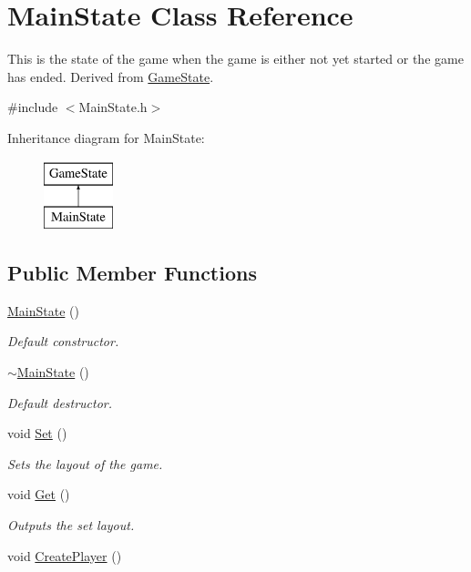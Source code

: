 \hypertarget{classMainState}{\section{Main\-State Class Reference}
\label{classMainState}
}


This is the state of the game when the game is either not yet started or the game has ended. Derived from \hyperlink{classGameState}{Game\-State}.  




{\ttfamily \#include $<$Main\-State.\-h$>$}

Inheritance diagram for Main\-State\-:\begin{figure}[H]
\begin{center}
\leavevmode
\includegraphics[height=2.000000cm]{classMainState}
\end{center}
\end{figure}
\subsection*{Public Member Functions}
\begin{DoxyCompactItemize}
\item 
\hyperlink{classMainState_afc29557ba046813d1bff4aea2501b7f1}{Main\-State} ()
\begin{DoxyCompactList}\small\item\em Default constructor. \end{DoxyCompactList}\item 
\hyperlink{classMainState_a81d631457b9c7777d09aff85a368acd9}{$\sim$\-Main\-State} ()
\begin{DoxyCompactList}\small\item\em Default destructor. \end{DoxyCompactList}\item 
void \hyperlink{classMainState_ac01eced9d617c8c8f5382a9aa96adb45}{Set} ()
\begin{DoxyCompactList}\small\item\em Sets the layout of the game. \end{DoxyCompactList}\item 
void \hyperlink{classMainState_a23233e859905d025cfc031a12977a844}{Get} ()
\begin{DoxyCompactList}\small\item\em Outputs the set layout. \end{DoxyCompactList}\item 
void \hyperlink{classMainState_ac8e8310c31fabb496be59d338ee2d9ec}{Create\-Player} ()
\end{DoxyCompactItemize}
